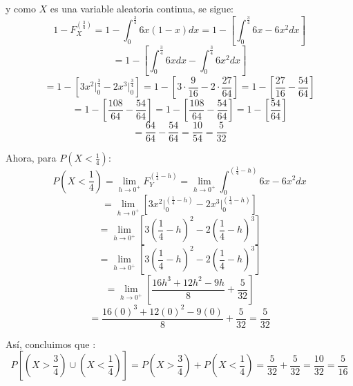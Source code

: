 \documentclass[12pt,a4paper]{report}
\begin{document}
\begin{enumerate}
{			y como $X$ es una variable aleatoria continua, se sigue:
				$$ 1 - F_X^{(\frac{3}{4})} = 1 - \int_{0}^{\frac{3}{4}} 6x(1-x) dx
				   = 1 - [\int_{0}^{\frac{3}{4}} 6x - 6x^2 dx]  $$
				$$ = 1 - [\int_{0}^{\frac{3}{4}} 6x dx - \int_{0}^{\frac{3}{4}} 6x^2 dx ] $$
				$$ = 1 - [3 x^2 \Big|_0^\frac{3}{4} - 2 x^3 \Big|_0^\frac{3}{4}]
				   = 1 - [3 \cdot \frac{9}{16} - 2  \cdot \frac{27}{64} ]
				   = 1 - [\frac{27}{16} - \frac{54}{64} ] $$
				$$ = 1 - [\frac{108}{64} - \frac{54}{64} ]
				   = 1 - [\frac{108}{64} - \frac{54}{64} ]
				   = 1 - [\frac{54}{64}] $$
				$$ = \frac{64}{64} - \frac{54}{64}  = \frac{10}{54} = \frac{5}{32}$$

			Ahora, para $P(X < \frac{1}{4})$:
				$$ P(X < \frac{1}{4}) = \lim_{h\to 0^+} F_Y^{(\frac{1}{4} - h)}
				   =  \lim_{h\to 0^+} \int_{0}^{(\frac{1}{4} - h)} 6x - 6x^2 dx $$
				$$ =  \lim_{h\to 0^+} [3 x^2 \Big|_0^{(\frac{1}{4} - h)} - 2 x^3 \Big|_0^{(\frac{1}{4} - h)}] $$
				$$ =  \lim_{h\to 0^+} [3 (\frac{1}{4} - h)^2 - 2(\frac{1}{4} - h)^3]$$
				$$ =  \lim_{h\to 0^+} [3 (\frac{1}{4} - h)^2 - 2(\frac{1}{4} - h)^3]$$
				$$ =  \lim_{h\to 0^+} [\frac{16h^3+12h^2-9h}{8} + \frac{5}{32}]$$
				$$ =  \frac{16(0)^3+12(0)^2-9(0)}{8} + \frac{5}{32} = \frac{5}{32}$$

			Así, concluimos que :
				$$ P[(X > \frac{3}{4}) \cup (X < \frac{1}{4})]
				 = P(X > \frac{3}{4}) + P(X < \frac{1}{4})
				 = \frac{5}{32} + \frac{5}{32} = \frac{10}{32} = \frac{5}{16}$$
		}


\end{enumerate}
\end{document}

